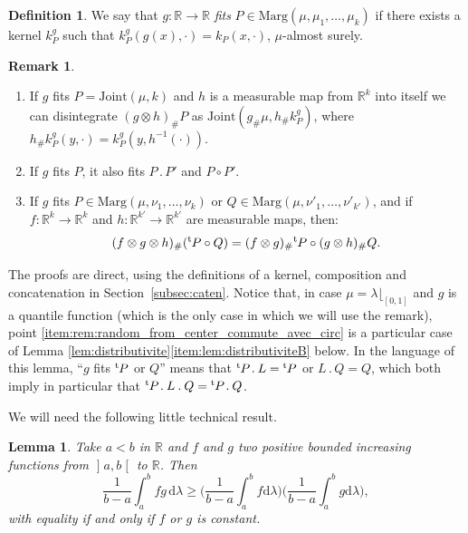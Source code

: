 \documentclass[10pt,a4paper]{article}
\providecommand{\skpt}{\smallskip}
\newcommand{\ldot}{\mathbin{.}}
\theoremstyle{plain}
\newtheorem{lem}[them]{Lemma}
\theoremstyle{definition}
\newtheorem{defi}[them]{Definition}
\newtheorem{rem}[them]{Remark}
\newcommand{\dd}{\mathrm{d}}
\newcommand{\join}{\mathrm{Joint}}
\newcommand{\trans}{{}^{\mathrm{t}}\mkern-1mu}
\newcommand{\la}{\lambda}
\newcommand{\ma}{\mathrm{Marg}}
\newcommand{\R}{\mathbb{R}}
\newcommand{\op}{\mathopen}
\newcommand{\clo}{\mathclose}
\begin{document}
\begin{defi}\label{defi:fits}
We say that $g:\R\to \R$ \emph{fits} $P\in \ma(\mu,\mu_1,\ldots,\mu_k)$ if there exists a kernel $k^g_P$ such that $k^g_P(g(x),\cdot)=k_{P}(x,\cdot)$, $\mu$-almost surely.
\end{defi}

\skpt
\begin{rem}\label{rem:random_from_center}\begin{enumerate}
\item
\label{item:rem:random_from_center_a} If $g$ fits $P=\join(\mu,k)$ and $h$ is a measurable map from $\R^k$ into itself we can disintegrate $(g\otimes h)_\#P$ as $\join(g_\#\mu,h_\#k^g_P)$, where $h_\#k^g_P(y,\cdot)= k^g_P(y,h^{-1}(\cdot))$.

\item
\label{item:rallonge} If $g$ fits $P$, it also fits $P\ldot P'$ and $P\circ P'$.

\item
\label{item:rem:random_from_center_commute_avec_circ} If $g$ fits $P\in \ma(\mu,\nu_1,\ldots,\nu_k)$ or $Q\in\ma(\mu,\nu'_1,\ldots,\nu'_{k'})$, and if $f:\R^k\to\R^k$ and $h:\R^{k'}\to\R^{k'}$ are measurable maps, then:
\[(f\otimes g \otimes h)_\#(\trans P\circ Q)=(f\otimes g)_\#\trans P\circ (g \otimes h)_\#Q.\]
\end{enumerate}

The proofs are direct, using the definitions of a kernel, composition and concatenation in Section~\ref{subsec:caten}. Notice that, in case $\mu=\la\lfloor_{[0,1]}$ and $g$ is a quantile function (which is the only case in which we will use the remark), point \eqref{item:rem:random_from_center_commute_avec_circ} is a particular case of Lemma \ref{lem:distributivite}\eqref{item:lem:distributiviteB} below. In the language of this lemma, ``$g$ fits $\trans P$ or $Q$'' means that $\trans P\ldot L=\trans P$ or $L\ldot Q=Q$, which both imply in particular that $\trans P\ldot L\ldot Q=\trans P\ldot Q$.
\end{rem}

We will need the following little technical result.

\begin{lem}\label{lem:int_fg}Take $a<b$ in $\R$ and $f$ and $g$ two positive bounded increasing functions from $\op]a,b\clo[$ to $\R$. Then
\[
\frac1{b-a}\int_a^b fg\,\dd\la\geq \biggl(\frac1{b-a}\int_a^b f\dd\la\biggr)\biggl(\frac1{b-a}\int_a^b g\dd\la\biggr),
\]
with equality if and only if $f$ or $g$ is constant.
\end{lem}
\end{document}
